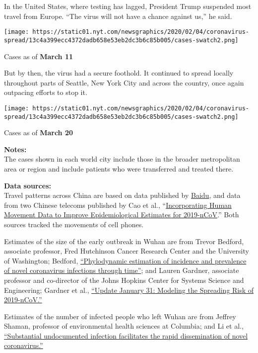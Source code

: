 In the United States, where testing has lagged, President Trump
suspended most travel from Europe. ``The virus will not have a chance
against us,'' he said.

\texttt{[image: https://static01.nyt.com/newsgraphics/2020/02/04/coronavirus-spread/13c4a399ecc4372dadb658e53eb2dc3b6c85b005/cases-swatch2.png]}

Cases as of \textbf{March 11}

But by then, the virus had a secure foothold. It continued to spread
locally throughout parts of Seattle, New York City and across the
country, once again outpacing efforts to stop it.

\texttt{[image: https://static01.nyt.com/newsgraphics/2020/02/04/coronavirus-spread/13c4a399ecc4372dadb658e53eb2dc3b6c85b005/cases-swatch2.png]}

Cases as of \textbf{March 20}

\textbf{Notes:}\\
The cases shown in each world city include those in the broader
metropolitan area or region and include patients who were transferred
and treated there.

\textbf{Data sources:}\\
Travel patterns across China are based on data published by
\href{https://qianxi.baidu.com/}{Baidu}, and data from two Chinese
telecoms published by Cao et al.,
``\href{https://www.medrxiv.org/node/71912.external-links.html}{Incorporating
Human Movement Data to Improve Epidemiological Estimates for
2019-nCoV}.'' Both sources tracked the movements of cell phones.

Estimates of the size of the early outbreak in Wuhan are from Trevor
Bedford, associate professor, Fred Hutchinson Cancer Research Center and
the University of Washington; Bedford,
\href{https://bedford.io/projects/ncov-phylodynamics/}{``Phylodynamic
estimation of incidence and prevalence of novel coronavirus infections
through time''}; and Lauren Gardner, associate professor and co-director
of the Johns Hopkins Center for Systems Science and Engineering; Gardner
et al.,
\href{https://systems.jhu.edu/research/public-health/ncov-model-2/}{``Update
January 31: Modeling the Spreading Risk of 2019-nCoV.''}

Estimates of the number of infected people who left Wuhan are from
Jeffrey Shaman, professor of environmental health sciences at Columbia;
and Li et al.,
\href{https://science.sciencemag.org/content/early/2020/03/13/science.abb3221}{``Substantial
undocumented infection facilitates the rapid dissemination of novel
coronavirus.''}

